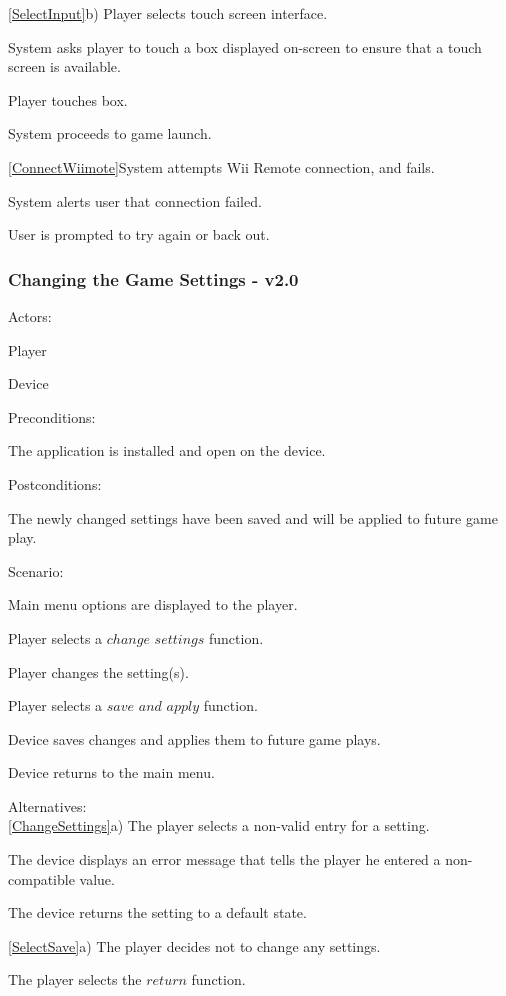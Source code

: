 \documentclass[12pt]{article}
\newenvironment{itemize*}%
  {\begin{itemize}%
  	\setlength{\parsep}{0pt}
    \setlength{\itemsep}{0pt}%
    \setlength{\parskip}{0pt}}%
  {\end{itemize}}
\newenvironment{enumerate*}%
  {\begin{enumerate}%
  	\setlength{\parsep}{0pt}
    \setlength{\itemsep}{0pt}%
    \setlength{\parskip}{0pt}}%
  {\end{enumerate}}
\begin{document}
\ref{SelectInput}b) Player selects touch screen interface.
\begin{enumerate*}
\item System asks player to touch a box displayed on-screen to ensure 
  that a touch screen is available.
\item Player touches box.
\item System proceeds to game launch.
\end{enumerate*}
\ref{ConnectWiimote}System attempts Wii Remote connection, and fails.
\begin{enumerate*}
\item System alerts user that connection failed.
\item User is prompted to try again or back out.
\end{enumerate*}

\subsubsection*{Changing the Game Settings - v2.0}
Actors:
\begin{itemize*}
\item Player
\item Device
\end{itemize*}
Preconditions:
\begin{itemize*}
\item The application is installed and open on the device.
\end{itemize*}
Postconditions:
\begin{itemize*}
\item The newly changed settings have been saved and will be applied to 
  future game play.
\end{itemize*}
Scenario:
\begin{enumerate*}
\item Main menu options are displayed to the player.
\item \label{SelectChangeSettings}Player selects a $change$ $settings$ 
  function.
\item \label{ChangeSettings}Player changes the setting(s).
\item \label{SelectSave}Player selects a $save$ $and$ $apply$ function.
\item \label{SystemSaves}Device saves changes and applies them to future 
  game plays.
\item \label{ReturnToMainMenu}Device returns to the main menu.
\end{enumerate*}
Alternatives:\\
\ref{ChangeSettings}a) The player selects a non-valid entry for a setting.
\begin{enumerate*}
\item The device displays an error message that tells the player he 
  entered a non-compatible value.
\item The device returns the setting to a default state.
\end{enumerate*}
\ref{SelectSave}a) The player decides not to change any settings.
\begin{enumerate*}
\item The player selects the $return$ function.
\end{enumerate*}
\onehalfspacing
\end{document}
